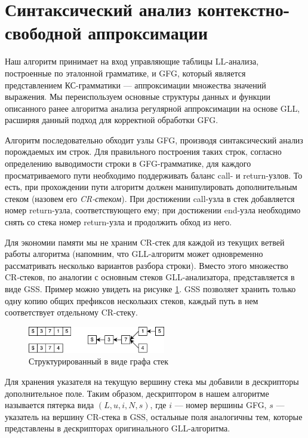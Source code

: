 \section{Синтаксический анализ контекстно-свободной аппроксимации}

Наш алгоритм принимает на вход управляющие таблицы LL-анализа, построенные по эталонной грамматике, и GFG, который является представлением КС-грамматики --- аппроксимации множества значений выражения. 
Мы переиспользуем основные структуры данных и функции описанного ранее алгоритма анализа регулярной аппроксимации на основе GLL, расширяя данный подход для корректной обработки GFG.

Алгоритм последовательно обходит узлы GFG, производя синтаксический анализ порождаемых им строк. 
Для правильного построения таких строк, согласно определению выводимости строки в GFG-грамматике, для каждого просматриваемого пути необходимо поддерживать баланс call- и return-узлов. 
То есть, при прохождении пути алгоритм должен манипулировать дополнительным стеком (назовем его \textit{CR-стеком}). 
При достижении call-узла в стек добавляется номер return-узла, соответствующего ему; при достижении end-узла необходимо снять со стека номер return-узла и продолжить обход из него. 

Для экономии памяти мы не храним CR-стек для каждой из текущих ветвей работы алгоритма (напомним, что GLL-алгоритм может одновременно рассматривать несколько вариантов разбора строки). 
Вместо этого множество CR-стеков, по аналогии с основным стеков GLL-анализатора, представляется в виде GSS. 
Пример можно увидеть на рисунке \ref{fig:gss}. GSS позволяет хранить только одну копию общих префиксов нескольких стеков, каждый путь в нем соответствует отдельному CR-стеку.

\begin{figure}[h]
	\centering
	\includegraphics[width=6cm]{pictures/gss_cr}
	\caption{Структурированный в виде графа стек}
	\label{fig:gss}
\end{figure}

Для хранения указателя на текущую вершину стека мы добавили в дескрипторы дополнительное поле. 
Таким образом, дескриптором в нашем алгоритме называется пятерка вида $(L, u, i, N, s)$, где $i$ --- номер вершины GFG, $s$ --- указатель на вершину CR-стека в GSS, остальные поля аналогичны тем, которые представлены в дескрипторах оригинального GLL-алгоритма.

